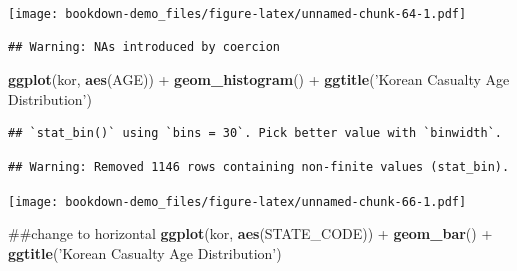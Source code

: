 \documentclass[]{book}
\newenvironment{Shaded}{\begin{snugshade}}{\end{snugshade}}
\newcommand{\KeywordTok}[1]{\textcolor[rgb]{0.13,0.29,0.53}{\textbf{{#1}}}}
\newcommand{\DataTypeTok}[1]{\textcolor[rgb]{0.13,0.29,0.53}{{#1}}}
\newcommand{\StringTok}[1]{\textcolor[rgb]{0.31,0.60,0.02}{{#1}}}
\newcommand{\NormalTok}[1]{{#1}}
\begin{document}
\begin{Shaded}
\end{Shaded}

\texttt{[image: bookdown-demo\_files/figure-latex/unnamed-chunk-64-1.pdf]}

\begin{Shaded}
\end{Shaded}

\begin{verbatim}
## Warning: NAs introduced by coercion
\end{verbatim}

\begin{Shaded}
\end{Shaded}

\begin{Shaded}
\begin{Highlighting}[]
\KeywordTok{ggplot}\NormalTok{(kor, }\KeywordTok{aes}\NormalTok{(AGE)) +}\StringTok{ }\KeywordTok{geom_histogram}\NormalTok{() +}\StringTok{ }\KeywordTok{ggtitle}\NormalTok{(}\StringTok{'Korean Casualty Age Distribution'}\NormalTok{)}
\end{Highlighting}
\end{Shaded}

\begin{verbatim}
## `stat_bin()` using `bins = 30`. Pick better value with `binwidth`.
\end{verbatim}

\begin{verbatim}
## Warning: Removed 1146 rows containing non-finite values (stat_bin).
\end{verbatim}

\texttt{[image: bookdown-demo\_files/figure-latex/unnamed-chunk-66-1.pdf]}

\begin{Shaded}
\begin{Highlighting}[]
\NormalTok{##change to horizontal}
\KeywordTok{ggplot}\NormalTok{(kor, }\KeywordTok{aes}\NormalTok{(STATE_CODE)) +}\StringTok{ }\KeywordTok{geom_bar}\NormalTok{() +}\StringTok{ }\KeywordTok{ggtitle}\NormalTok{(}\StringTok{'Korean Casualty Age Distribution'}\NormalTok{) }
\end{Highlighting}
\end{Shaded}
\end{document}
